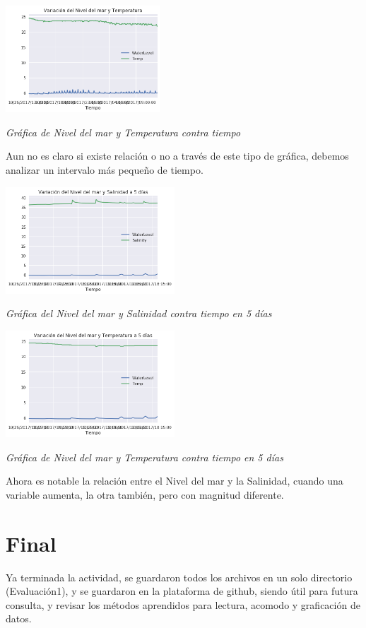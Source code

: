 \documentclass[a4paper]{article}
\begin{document}
\begin{center}
	\includegraphics[height=4cm]{Gr5.png}
    
    \textit{Gráfica de Nivel del mar y Temperatura contra tiempo}
\end{center}

Aun no es claro si existe relación o no a través de este tipo de gráfica, debemos analizar un intervalo más pequeño de tiempo.

\begin{center}
	\includegraphics[height=4cm]{Gr6.png}
    
    \textit{Gráfica del Nivel del mar y Salinidad contra tiempo en 5 días}
\end{center}

\begin{center}
	\includegraphics[height=4cm]{Gr7.png}
    
    \textit{Gráfica de Nivel del mar y Temperatura contra tiempo en 5 días}
\end{center}

Ahora es notable la relación entre el Nivel del mar y la Salinidad, cuando una variable aumenta, la otra también, pero con magnitud diferente.

\section{Final}

Ya terminada la actividad, se guardaron todos los archivos en un solo directorio (Evaluación1), y se guardaron en la plataforma de github, siendo útil para futura consulta, y revisar los métodos aprendidos para lectura, acomodo y graficación de datos.
\end{document}
